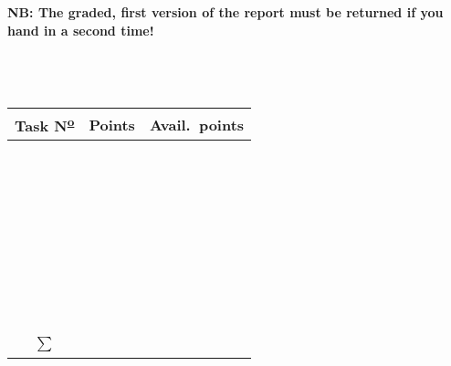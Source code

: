 
\begin{titlepage}

\setcounter{page}{0}

\begin{center}
{\huge \bf \color{red} NB: The graded, first version of the report must be
                           returned if you hand in a second time! } \\
\vspace{3cm}
\makeatletter
{ \huge \@title } \\
\vspace{1cm}
{ \Large \@author }\\
\vspace{1cm}
{ \Large \@date }\\
\makeatother
\end{center}

\vfill

\begin{flushright}
{\Large
\begin{tabular}{|c|c|c|}
\hline
Task N\textsuperscript{\underline{o}} & Points & Avail.\ points \\ \hline
\hspace{3cm} & \hspace{3cm} & \hspace{3cm} \\ \hline
~ & ~ & ~ \\ \hline
~ & ~ & ~ \\ \hline
~ & ~ & ~ \\ \hline
~ & ~ & ~ \\ \hline
~ & ~ & ~ \\ \hline
~ & ~ & ~ \\ \hline
~ & ~ & ~ \\ \hline
$\sum$ & ~ & ~ \\
\hline
\end{tabular}}
\end{flushright}

\end{titlepage}


